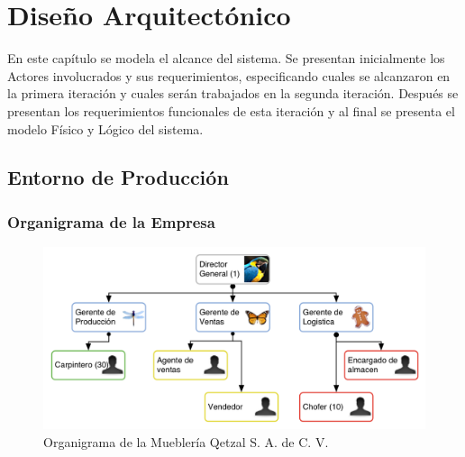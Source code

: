 \chapter{Diseño Arquitectónico}
\label{cap:reqUsr}

	En este capítulo se modela el alcance del sistema. Se presentan inicialmente los Actores involucrados y sus requerimientos, especificando cuales se alcanzaron en la primera iteración y cuales serán trabajados en la segunda iteración. Después se presentan los requerimientos funcionales de esta iteración y al final se presenta el modelo Físico y Lógico del sistema.


\section{Entorno de Producción}

\subsection{Organigrama de la Empresa}
\begin{figure}[htbp]
	\begin{center}
		\includegraphics[width=.8\textwidth]{images/organigramaEm}
		\caption{Organigrama de la Mueblería Qetzal S. A. de C. V.}
		\label{fig:organigrama}
	\end{center}
\end{figure}


